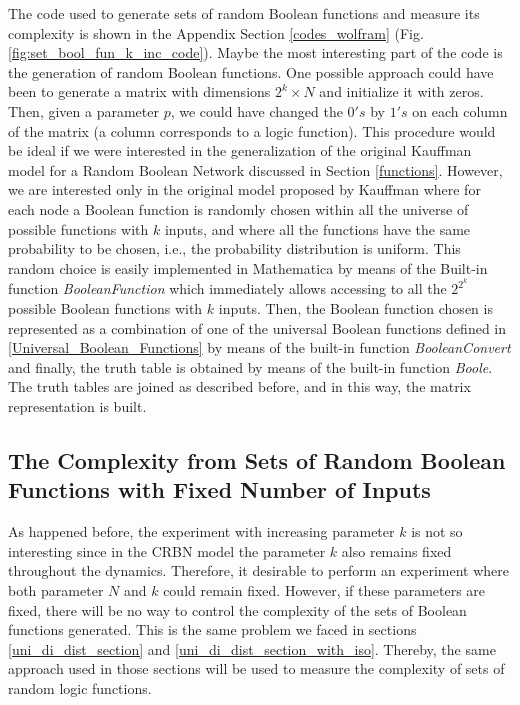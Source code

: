 The code used to generate sets of random Boolean functions and measure its complexity is shown in the Appendix Section \ref{codes_wolfram} (Fig. \ref{fig:set_bool_fun_k_inc_code}). Maybe the most interesting part of the code is the generation of random Boolean functions. One possible approach could have been to generate a matrix with dimensions $2^{k} \times N$ and initialize it with zeros. Then, given a parameter $p$, we could have changed the $0's$ by $1's$ on each column of the matrix (a column corresponds to a logic function). This procedure would be ideal if we were interested in the generalization of the original Kauffman model for a Random Boolean Network discussed in Section \ref{functions}. However, we are interested only in the original model proposed by Kauffman where for each node a Boolean function is randomly chosen within all the universe of possible functions with $k$ inputs, and where all the functions have the same probability to be chosen, i.e., the probability distribution is uniform. This random choice is easily implemented in Mathematica by means of the Built-in function \textit{BooleanFunction} which immediately allows accessing to all the $2^{2^{k}}$ possible Boolean functions with $k$ inputs. Then, the Boolean function chosen is represented as a combination of one of the universal Boolean functions defined in \ref{Universal_Boolean_Functions} by means of the built-in function \textit{BooleanConvert} and finally, the truth table is obtained by means of the built-in function \textit{Boole}. The truth tables are joined as described before, and in this way, the matrix representation is built. 


\subsection{The Complexity from Sets of Random Boolean Functions with Fixed Number of Inputs}
As happened before, the experiment with increasing parameter $k$ is not so interesting since in the CRBN model the parameter $k$ also remains fixed throughout the dynamics. Therefore, it desirable to perform an experiment where both parameter $N$ and $k$ could remain fixed. However, if these parameters are fixed, there will be no way to control the complexity of the sets of Boolean functions generated. This is the same problem we faced in sections \ref{uni_di_dist_section} and \ref{uni_di_dist_section_with_iso}. Thereby, the same approach used in those sections will be used to measure the complexity of sets of random logic functions.\\


